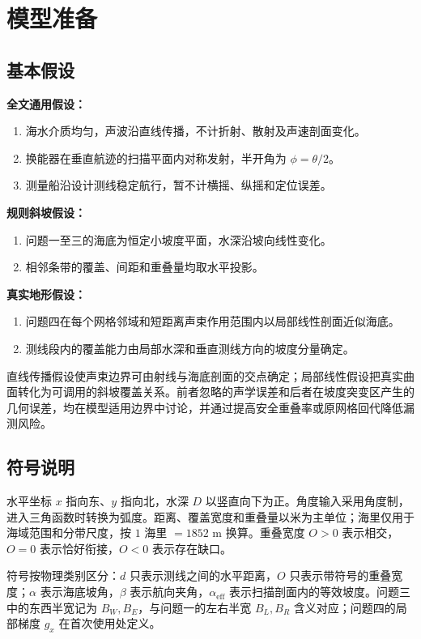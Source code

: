 \section{模型准备}

\subsection{基本假设}

\textbf{全文通用假设：}
\begin{enumerate}
  \item 海水介质均匀，声波沿直线传播，不计折射、散射及声速剖面变化。
  \item 换能器在垂直航迹的扫描平面内对称发射，半开角为 $\phi=\theta/2$。
  \item 测量船沿设计测线稳定航行，暂不计横摇、纵摇和定位误差。
\end{enumerate}

\textbf{规则斜坡假设：}
\begin{enumerate}
  \item 问题一至三的海底为恒定小坡度平面，水深沿坡向线性变化。
  \item 相邻条带的覆盖、间距和重叠量均取水平投影。
\end{enumerate}

\textbf{真实地形假设：}
\begin{enumerate}
  \item 问题四在每个网格邻域和短距离声束作用范围内以局部线性剖面近似海底。
  \item 测线段内的覆盖能力由局部水深和垂直测线方向的坡度分量确定。
\end{enumerate}

直线传播假设使声束边界可由射线与海底剖面的交点确定；局部线性假设把真实曲面转化为可调用的斜坡覆盖关系。前者忽略的声学误差和后者在坡度突变区产生的几何误差，均在模型适用边界中讨论，并通过提高安全重叠率或原网格回代降低漏测风险。

\subsection{符号说明}

水平坐标 $x$ 指向东、$y$ 指向北，水深 $D$ 以竖直向下为正。角度输入采用角度制，进入三角函数时转换为弧度。距离、覆盖宽度和重叠量以米为主单位；海里仅用于海域范围和分带尺度，按 $1$ 海里 $=1852$ m 换算。重叠宽度 $O>0$ 表示相交，$O=0$ 表示恰好衔接，$O<0$ 表示存在缺口。

符号按物理类别区分：$d$ 只表示测线之间的水平距离，$O$ 只表示带符号的重叠宽度；$\alpha$ 表示海底坡角，$\beta$ 表示航向夹角，$\alpha_{\mathrm{eff}}$ 表示扫描剖面内的等效坡度。问题三中的东西半宽记为 $B_W,B_E$，与问题一的左右半宽 $B_L,B_R$ 含义对应；问题四的局部梯度 $g_x$ 在首次使用处定义。

